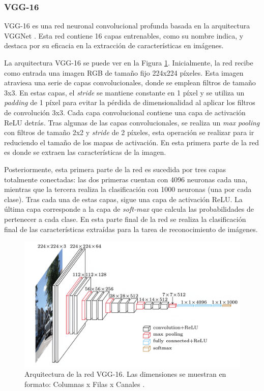 \subsubsection{VGG-16}\label{vgg16}

VGG-16 es una red neuronal convolucional profunda basada en la arquitectura VGGNet \cite{65}. Esta red contiene 16 capas entrenables, como su nombre indica, y destaca por su eficacia en la extracción de características en imágenes.

La arquitectura VGG-16 se puede ver en la Figura \ref{fig26}. Inicialmente, la red recibe como entrada una imagen RGB de tamaño fijo 224x224 píxeles. Esta imagen atraviesa una serie de capas convolucionales, donde se emplean filtros de tamaño 3x3. En estas capas, el \textit{stride} se mantiene constante en 1 píxel y se utiliza un \textit{padding} de 1 píxel para evitar la pérdida de dimensionalidad al aplicar los filtros de convolución 3x3. Cada capa convolucional contiene una capa de activación ReLU detrás. Tras algunas de las capas convolucionales, se realiza un \textit{max pooling} con filtros de tamaño 2x2 y \textit{stride} de 2 píxeles, esta operación se realizar para ir reduciendo el tamaño de los mapas de activación. En esta primera parte de la red es donde se extraen las características de la imagen.

Posteriormente, esta primera parte de la red es sucedida por tres capas totalmente conectadas: las dos primeras cuentan con 4096 neuronas cada una, mientras que la tercera realiza la clasificación con 1000 neuronas (una por cada clase). Tras cada una de estas capas, sigue una capa de activación ReLU. La última capa corresponde a la capa de \textit{soft-max} que calcula las probabilidades de pertenecer a cada clase. En esta parte final de la red se realiza la clasificación final de las características extraídas para la tarea de reconocimiento de imágenes.

\begin{figure}[h]
	\centering
	\includegraphics[scale=0.1]{imagenes/cap4/vgg-16.png}
	\caption[Arquitectura de la red VGG-16.]{Arquitectura de la red VGG-16. Las dimensiones se muestran en formato: Columnas x Filas x Canales \cite{66}.}
	\label{fig26}
\end{figure}

